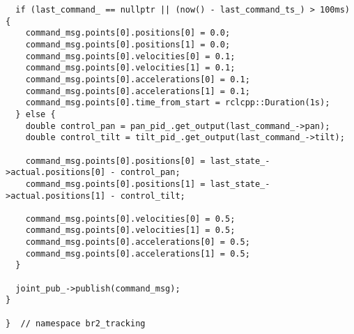 \begin{tcolorbox}[sharp corners, colframe=gray!80, colback=LightGray, left=0pt, top=0pt, bottom=0pt, title=\texttt{br2\_tracking/src/br2\_tracking/HeadController.cpp}]
\begin{verbatim}
  if (last_command_ == nullptr || (now() - last_command_ts_) > 100ms) {
    command_msg.points[0].positions[0] = 0.0;
    command_msg.points[0].positions[1] = 0.0;
    command_msg.points[0].velocities[0] = 0.1;
    command_msg.points[0].velocities[1] = 0.1;
    command_msg.points[0].accelerations[0] = 0.1;
    command_msg.points[0].accelerations[1] = 0.1;
    command_msg.points[0].time_from_start = rclcpp::Duration(1s);
  } else {
    double control_pan = pan_pid_.get_output(last_command_->pan);
    double control_tilt = tilt_pid_.get_output(last_command_->tilt);

    command_msg.points[0].positions[0] = last_state_->actual.positions[0] - control_pan;
    command_msg.points[0].positions[1] = last_state_->actual.positions[1] - control_tilt;

    command_msg.points[0].velocities[0] = 0.5;
    command_msg.points[0].velocities[1] = 0.5;
    command_msg.points[0].accelerations[0] = 0.5;
    command_msg.points[0].accelerations[1] = 0.5;
  }

  joint_pub_->publish(command_msg);
}

}  // namespace br2_tracking
    \end{verbatim}
    \end{tcolorbox}
  \normalsize

